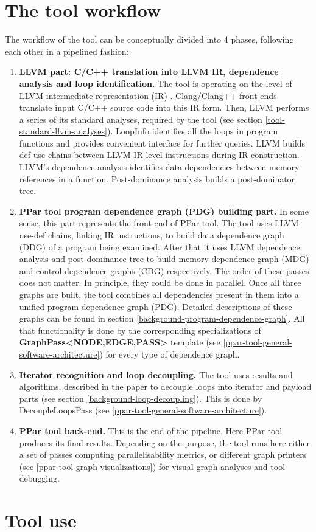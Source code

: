 \section{The tool workflow} \label{ppar-tool-workflow}
\qquad The workflow of the tool can be conceptually divided into 4 phases, following each other in a pipelined fashion:
\begin{enumerate}[align=left,leftmargin=*]
\item \textbf{LLVM part: C/C++ translation into LLVM IR, dependence analysis and loop identification.} The tool is operating on the level of LLVM intermediate representation (IR) \cite{llvm-online-docs-ir}. Clang/Clang++ front-ends translate input C/C++ source code into this IR form. Then, LLVM performs a series of its standard analyses, required by the tool (see section \ref{tool-standard-llvm-analyses}). LoopInfo identifies all the loops in program functions and provides convenient interface for further queries. LLVM builds def-use chains between LLVM IR-level instructions during IR construction. LLVM's dependence analysis identifies data dependencies between memory references in a function. Post-dominance analysis builds a post-dominator tree.
	
\item \textbf{PPar tool program dependence graph (PDG) building part.} In some sense, this part represents the front-end of PPar tool. The tool uses LLVM use-def chains, linking IR instructions, to build data dependence graph (DDG) of a program being examined. After that it uses LLVM dependence analysis and post-dominance tree to build memory dependence graph (MDG) and control dependence graphs (CDG) respectively. The order of these passes does not matter. In principle, they could be done in parallel. Once all three graphs are built, the tool combines all dependencies present in them into a unified program dependence graph (PDG). Detailed descriptions of these graphs can be found in section \ref{background-program-dependence-graph}. All that functionality is done by the corresponding specializations of \textbf{GraphPass\textless NODE,EDGE,PASS\textgreater} template (see \ref{ppar-tool-general-software-architecture}) for every type of dependence graph.   

\item \textbf{Iterator recognition and loop decoupling.} The tool uses results and algorithms, described in the paper \cite{iterator-recognition-paper} to decouple loops into iterator and payload parts (see section \ref{background-loop-decoupling}). This is done by DecoupleLoopsPass (see \ref{ppar-tool-general-software-architecture}).

\item \textbf{PPar tool back-end.} This is the end of the pipeline. Here PPar tool produces its final results. Depending on the purpose, the tool runs here either a set of passes computing parallelisability metrics, or different graph printers (see \ref{ppar-tool-graph-visualizations}) for visual graph analyses and tool debugging. 
		  
\end{enumerate}

\section{Tool use} \label{ppar-tool-use}

\qquad 




